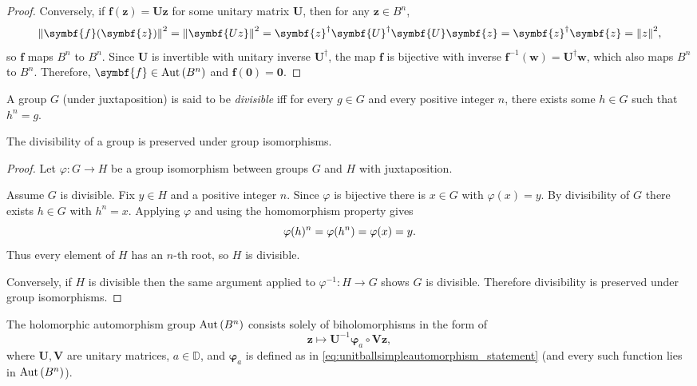\begin{proof}
    Conversely, if \(\symbf{f}(\symbf{z})=\symbf{U}\symbf{z}\) for some unitary matrix \(\symbf{U}\), then for any \(\symbf{z}\in B^n\), \[\norm{\symbf{f}(\symbf{z})}^2=\norm{\symbf{Uz}}^2=\symbf{z}^\dagger\symbf{U}^\dagger\symbf{U}\symbf{z}=\symbf{z}^\dagger\symbf{z}=\norm{z}^2,\]
    so \(\symbf{f}\) maps \(B^n\) to \(B^n\). Since \(\symbf{U}\) is invertible with unitary inverse \(\symbf{U}^\dagger\), the map \(\symbf{f}\) is bijective with inverse \(\symbf{f}^{-1}(\symbf{w})=\symbf{U}^\dagger\symbf{w}\), which also maps \(B^n\) to \(B^n\). Therefore, \(\symbf{f}\in\Aut\qty(B^n)\) and \(\symbf{f}(\symbf{0})=\symbf{0}\).
\end{proof}
\begin{definition}
    A group \(G\) (under juxtaposition) is said to be \textit{divisible} iff for every \(g\in G\) and every positive integer \(n\), there exists some \(h\in G\) such that \(h^n=g\).
\end{definition}
\begin{proposition}\label{prop:groupdivisibilitypreservedunderisomorphisms}
    The divisibility of a group is preserved under group isomorphisms.
\end{proposition}
\begin{proof}
    Let \(\varphi:G\to H\) be a group isomorphism between groups \(G\) and \(H\) with juxtaposition.

    Assume \(G\) is divisible. Fix \(y\in H\) and a positive integer \(n\). Since \(\varphi\) is bijective there is \(x\in G\) with \(\varphi(x)=y\). By divisibility of \(G\) there exists \(h\in G\) with \(h^n=x\). Applying \(\varphi\) and using the homomorphism property gives
    \[\varphi(h)^n=\varphi\qty(h^n)=\varphi(x)=y.\]
    Thus every element of \(H\) has an \(n\)-th root, so \(H\) is divisible.

    Conversely, if \(H\) is divisible then the same argument applied to \(\varphi^{-1}:H\to G\) shows \(G\) is divisible. Therefore divisibility is preserved under group isomorphisms.
\end{proof}
\begin{theorem}\label{thm:holomorphicautomorphismgrouponunitball}
    The holomorphic automorphism group \(\operatorname{Aut}\qty(B^n)\) consists solely of biholomorphisms in the form of
    \begin{equation}
        \symbf{z}\mapsto\symbf{U}^{-1}\symbf{\varphi}_{a}\circ\symbf{V}\symbf{z},\label{eq:holomorphicautomorphismgrouponunitball_statement}
    \end{equation} where \(\symbf{U},\symbf{V}\) are unitary matrices, \(a\in\mathbb{D}\), and \(\symbf{\varphi}_a\) is defined as in \cref{eq:unitballsimpleautomorphism_statement} (and every such function lies in \(\operatorname{Aut}\qty(B^n)\)).
\end{theorem}
